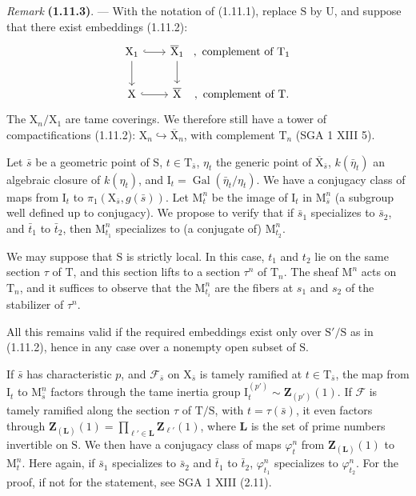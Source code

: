 \documentclass[11pt,leqno]{article}
\begin{document}
\textit{Remark} \textbf{(1.11.3)}. — With the notation of (1.11.1), replace \(\mathrm{S}\) by \(\mathrm{U}\), and suppose that there exist embeddings (1.11.2):
\[
\begin{tikzcd}[column sep=2em,row sep=2em]
\mathrm{X}_1 \arrow[r,hook] \arrow[d]
  & \overline{\mathrm{X}}_1 \arrow[d]
  &[-2em] {,\ \text{complement of }\mathrm{T}_1} \\
\mathrm{X} \arrow[r,hook]
  & \overline{\mathrm{X}}
  &[-2em] {,\ \text{complement of }\mathrm{T}.}
\end{tikzcd}
\]
The \(\mathrm{X}_n/\mathrm{X}_1\) are tame coverings. We therefore still have a tower of compactifications (1.11.2): \(\mathrm{X}_n\hookrightarrow\overline{\mathrm{X}}_n\), with complement \(\mathrm{T}_n\) (SGA 1 XIII 5).

Let \(\bar{s}\) be a geometric point of \(\mathrm{S}\), \(t\in\mathrm{T}_{\bar{s}}\), \(\eta_t\) the generic point of \(\overline{\mathrm{X}}_{\bar{s}}\), \(k(\bar{\eta}_t)\) an algebraic closure of \(k(\eta_t)\), and \(\mathrm{I}_t=\operatorname{Gal}(\bar{\eta}_t/\eta_t)\). We have a conjugacy class of maps from \(\mathrm{I}_t\) to \(\pi_1(\mathrm{X}_{\bar{s}},g(\bar{s}))\). Let \(\mathrm{M}_t^n\) be the image of \(\mathrm{I}_t\) in \(\mathrm{M}_{\bar{s}}^n\) (a subgroup well defined up to conjugacy). We propose to verify that if \(\bar{s}_1\) specializes to \(\bar{s}_2\), and \(\bar{t}_1\) to \(\bar{t}_2\), then \(\mathrm{M}_{t_1}^n\) specializes to (a conjugate of) \(\mathrm{M}_{t_2}^n\).

We may suppose that \(\mathrm{S}\) is strictly local. In this case, \(t_1\) and \(t_2\) lie on the same section \(\tau\) of \(\mathrm{T}\), and this section lifts to a section \(\tau^n\) of \(\mathrm{T}_n\). The sheaf \(\mathrm{M}^n\) acts on \(\mathrm{T}_n\), and it suffices to observe that the \(\mathrm{M}_{t_i}^n\) are the fibers at \(s_1\) and \(s_2\) of the stabilizer of \(\tau^n\).

All this remains valid if the required embeddings exist only over \(\mathrm{S}'/\mathrm{S}\) as in (1.11.2), hence in any case over a nonempty open subset of \(\mathrm{S}\).

If \(\bar{s}\) has characteristic \(p\), and \(\mathscr{F}_{\bar{s}}\) on \(\mathrm{X}_{\bar{s}}\) is tamely ramified at \(t\in\mathrm{T}_{\bar{s}}\), the map from \(\mathrm{I}_t\) to \(\mathrm{M}_{\bar{s}}^n\) factors through the tame inertia group \(\mathrm{I}_t^{(p')}\sim\mathbf{Z}_{(p')}(1)\). If \(\mathscr{F}\) is tamely ramified along the section \(\tau\) of \(\mathrm{T}/\mathrm{S}\), with \(t=\tau(\bar{s})\), it even factors through \(\mathbf{Z}_{(\mathbf{L})}(1)=\displaystyle\prod_{\ell'\in\mathbf{L}}\mathbf{Z}_{\ell'}(1)\), where \(\mathbf{L}\) is the set of prime numbers invertible on \(\mathrm{S}\). We then have a conjugacy class of maps \(\varphi_t^n\) from \(\mathbf{Z}_{(\mathbf{L})}(1)\) to \(\mathrm{M}_t^n\). Here again, if \(\bar{s}_1\) specializes to \(\bar{s}_2\) and \(\bar{t}_1\) to \(\bar{t}_2\), \(\varphi_{t_1}^n\) specializes to \(\varphi_{t_2}^n\). For the proof, if not for the statement, see SGA 1 XIII (2.11).
\end{document}
